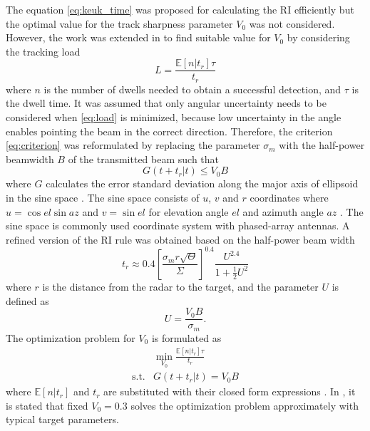 \documentclass[english, 12pt, a4paper, elec, utf8, a-1b, online]{aaltothesis}
\newcommand{\E}[1]{\mathbb{E}\left[ #1 \right]}
\begin{document}
The equation \eqref{eq:keuk_time} was proposed for calculating the RI efficiently but the optimal value for the track sharpness parameter $V_0$ was not considered.
However, the work was extended in \cite{vanKeuk1993} to find suitable value for $V_0$ by considering the tracking load
\begin{equation}\label{eq:load}
    L = \frac{\E{n | t_r} \tau}{t_r}
\end{equation}
where $n$ is the number of dwells needed to obtain a successful detection, and $\tau$ is the dwell time.
It was assumed that only angular uncertainty needs to be considered when \eqref{eq:load} is minimized, 
because low uncertainty in the angle enables pointing the beam in the correct direction.
Therefore, the criterion \eqref{eq:criterion} was reformulated by replacing the parameter $\sigma_m$ with the half-power beamwidth $B$ of the transmitted beam such that
\begin{equation} \label{eq:criterion2}
    G(t + t_r | t) \leq V_0 B
\end{equation}
where $G$ calculates the error standard deviation along the major axis of ellipsoid in the sine space \cite{vanKeuk1993}.
The sine space consists of $u$, $v$ and $r$ coordinates where $u=\cos el \sin az$ and $v=\sin el$ for elevation angle $el$ and azimuth angle $az$ \cite{Mailloux2017}.
The sine space is commonly used coordinate system with phased-array antennas.
A refined version of the RI rule was obtained based on the half-power beam width
\begin{equation}\label{eq:van_keuk_revisited}
    t_r \approx 0.4 \left[ \frac{\sigma_m r \sqrt{\Theta}}{\Sigma} \right]^{0.4} \frac{U^{2.4}}{1+\frac{1}{2}U^2}
\end{equation}
where $r$ is the distance from the radar to the target, and the parameter $U$ is defined as
\begin{equation}
    U = \frac{V_0 B}{\sigma_m}.
\end{equation}
The optimization problem for $V_0$ is formulated as 
\begin{equation}
\begin{array}{ll}
     & \min_{V_0} \frac{\E{n | t_r} \tau}{t_r} \\ [7pt]
    \text{s.t.} & G(t + t_r | t) = V_0 B
\end{array}
\end{equation}
where $\E{n | t_r}$ and $t_r$ are substituted with their closed form expressions \cite{vanKeuk1993}.
In \cite{vanKeuk1993}, it is stated that fixed $V_0=0.3$ solves the optimization problem approximately with typical target parameters.
\end{document}
